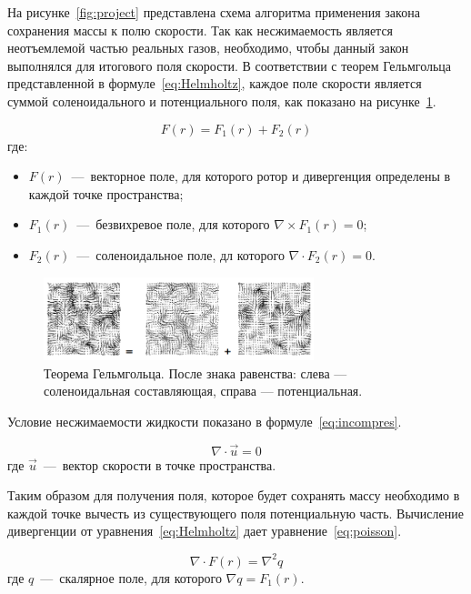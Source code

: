 На рисунке~\ref{fig:project} представлена схема алгоритма применения закона сохранения массы к полю скорости. Так как несжимаемость является неотъемлемой частью реальных газов, необходимо, чтобы данный закон выполнялся для итогового поля скорости. В соответствии с теорем Гельмгольца представленной в формуле~\ref{eq:Helmholtz}, каждое поле скорости является суммой соленоидального и потенциального поля, как показано на рисунке~\ref{fig:hodge}. 

\begin{equation}
	\label{eq:Helmholtz}
	F(r) = F_1(r)+F_2(r)
\end{equation}
где:
\begin{itemize}
	\item $F(r)$~---~векторное поле, для которого ротор и дивергенция определены в каждой точке пространства;
	\item $F_1(r)$~---~безвихревое поле, для которого $\nabla \times F_1(r) =0$;
	\item $F_2(r)$~---~соленоидальное поле, дл которого $\nabla \cdot F_2(r)=0$.
\end{itemize}

\begin{figure}[H]
	\centering
	\includegraphics[width=0.7\textwidth,page=1]{assets/img/hodge.png}
	\caption{Теорема Гельмгольца. После знака равенства: слева --- соленоидальная составляющая, справа --- потенциальная.}
	\label{fig:hodge}
\end{figure}

Условие несжимаемости жидкости показано в формуле~\ref{eq:incompres}.

\begin{equation}
	\label{eq:incompres}
	\nabla \cdot \vec{u} = 0
\end{equation}
где $\vec{u}$~---~вектор скорости в точке пространства.

Таким образом для получения поля, которое будет сохранять массу необходимо в каждой точке вычесть из существующего поля потенциальную часть. Вычисление дивергенции от уравнения~\ref{eq:Helmholtz} дает уравнение~\ref{eq:poisson}.

\begin{equation}
	\label{eq:poisson}
	\nabla \cdot F(r) = \nabla^2 q
\end{equation}
где $q$~---~скалярное поле, для которого $\nabla q = F_1(r)$.

